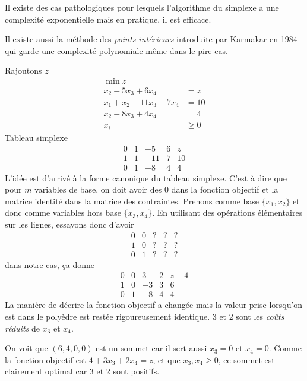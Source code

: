 Il existe des cas pathologiques pour lesquels l'algorithme
du simplexe a une complexité exponentielle
mais en pratique, il est efficace.

Il existe aussi la méthode des \emph{points intérieurs} introduite
par Karmakar en 1984 qui garde une complexité polynomiale même dans
le pire cas.

\begin{myexem}
  \label{ex:simplex}
  Rajoutons $z$
  \begin{align*}
    \min z\\
    x_2 - 5x_3+ 6x_4 & = z\\
    x_1 + x_2 - 11x_3 + 7x_4 & = 10\\
    x_2 - 8x_3 + 4x_4 & = 4\\
    x_i & \geq 0
  \end{align*}
  Tableau simplexe
  \[
    \begin{array}{cccc|c}
      0 & 1 & -5 & 6 & z\\
      \hline
      1 & 1 & -11 & 7 & 10\\
      0 & 1 & -8 & 4 & 4
    \end{array}
  \]
  L'idée est d'arrivé à la forme canonique du tableau simplexe.
  C'est à dire que pour $m$ variables de base, on doit avoir
  des $0$ dans la fonction objectif et la matrice identité
  dans la matrice des contraintes.
  Prenons comme base $\{x_1, x_2\}$ et
  donc comme variables hors base $\{x_3, x_4\}$.
  En utilisant des opérations élémentaires sur les lignes,
  essayons donc d'avoir
  \[
    \begin{array}{cccc|c}
      0 & 0 & ? & ? & ?\\
      \hline
      1 & 0 & ? & ? & ?\\
      0 & 1 & ? & ? & ?
    \end{array}
  \]
  dans notre cas, ça donne
  \[
    \begin{array}{cccc|c}
      0 & 0 & 3 & 2 & z-4\\
      \hline
      1 & 0 & -3 & 3 & 6\\
      0 & 1 & -8 & 4 & 4
    \end{array}
  \]
  La manière de décrire la fonction objectif a changée
  mais la valeur prise lorsqu'on
  est dans le polyèdre est restée rigoureusement identique.
  3 et 2 sont les \emph{coûts réduits} de $x_3$ et $x_4$.

  On voit que $(6, 4, 0, 0)$ est un sommet car il sert aussi $x_3 = 0$
  et $x_4 = 0$.
  Comme la fonction objectif est
  $4 + 3x_3 + 2x_4 = z$, et que $x_3, x_4 \geq 0$, ce sommet est clairement
  optimal car 3 et 2 sont positifs.


\end{myexem}
